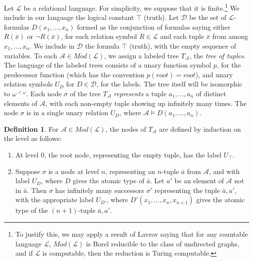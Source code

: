 \documentclass[10pt,a4paper]{article}
\theoremstyle{definition}
\newtheorem{defn}[thm]{Definition}
\begin{document}
	Let $\mathcal{L}$ be a relational language. For simplicity, we suppose that it is finite.\footnote{To justify this, we may apply a result of Lavrov \cite{Lavrov} saying that for any countable language $\mathcal{L}$, $Mod(\mathcal{L})$ is Borel reducible to the class of undirected graphs, and if $\mathcal{L}$ is computable, then the reduction is Turing computable.}
We include in our language the logical constant $\top$ (truth). Let $\mathcal{D}$ be the set of $\mathcal{L}$-formulas $D(x_1,\ldots,x_n)$ formed as the conjunction of formulas saying either $R(\bar{x})$ or $\neg{R(\bar{x})}$, for each relation symbol $R\in \mathcal{L}$ and each tuple $\bar{x}$ from among $x_1,\ldots,x_n$. We include in $\mathcal{D}$ the formula $\top$ (truth), with the empty sequence of variables. To each $\mathcal{A}\in Mod(\mathcal{L})$, we assign a labeled tree $T_\mathcal{A}$, the \emph{tree of tuples}. The language of the labeled trees consists of a unary function symbol $p$, for the predecessor function (which has the convention $p(root)=root$), and unary relation symbols $U_D$ for $D\in\mathcal{D}$, for the labels. The tree itself will be isomorphic to $\omega^{<\omega}$. Each node $\sigma$ of the tree $T_\mathcal{A}$ \emph{represents} a tuple $a_1,\ldots,a_n$ of distinct elements of $\mathcal{A}$, with each non-empty tuple showing up infinitely many times. The node $\sigma$ is in a single unary relation $U_D$, where $\mathcal{A}\models D(a_1,\ldots,a_n)$.

\bigskip


	
	\begin{defn}
		
		For $\mathcal{A}\in Mod(\mathcal{L})$, the nodes of $T_\mathcal{A}$ are defined by induction on the level as follows:
		
		\begin{enumerate}
			
			\item At level $0$, the root node, representing the empty tuple, has the label $U_\top$.
			
			\item Suppose $\sigma$ is a node at level $n$, representing an $n$-tuple $\bar{a}$ from $\mathcal{A}$, and with label $U_D$, where $D$ gives the atomic type of $\bar{a}$. Let $a'$ be an element of $\mathcal{A}$ not in $\bar{a}$. Then $\sigma$ has infinitely many successors $\sigma'$ representing the tuple $\bar{a},a'$, with the appropriate label $U_{D'}$, where $D'(x_1,\ldots,x_n,x_{n+1})$ gives the atomic type of the $(n+1)$-tuple $\bar{a},a'$. 
			
		\end{enumerate} 
		
	\end{defn}
	
\end{document}
